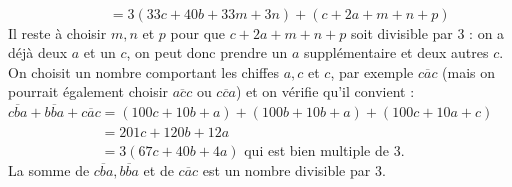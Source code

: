 \begin{corrige}
\begin{enumerate}
\begin{enumerate}
               $\phantom{\overline{cba}+\overline{bba}+\overline{mnp}} =3(33c+40b+33m+3n)+(c+2a+m+n+p)$ \\
               Il reste à choisir $m, n$ et $p$ pour que $c+2a+m+n+p$ soit divisible par 3 : on a déjà deux $a$ et un $c$, on peut donc prendre un $a$ supplémentaire et deux autres $c$. On choisit un nombre comportant les chiffes $a, c$ et $c$, par exemple $\overline{cac}$ (mais on pourrait également choisir $\overline{acc}$ ou $\overline{cca}$) et on vérifie qu'il convient : \\
               $\overline{cba}+\overline{bba}+\overline{cac} =(100c+10b+a)+(100b+10b+a)+(100c+10a+c)$ \\
               $\phantom{\overline{cba}+\overline{bba}+\overline{cac}} =201c+120b+12a$ \\
               $\phantom{\overline{cba}+\overline{bba}+\overline{cac}} =3(67c+40b+4a)$ qui est bien multiple de 3. \\     
                {\blue La somme de $\overline{cba}, \overline{bba}$ et de $\overline{cac}$ est un nombre divisible par 3.}
      \end{enumerate}
   \end{enumerate}
\end{corrige}


\bigskip


